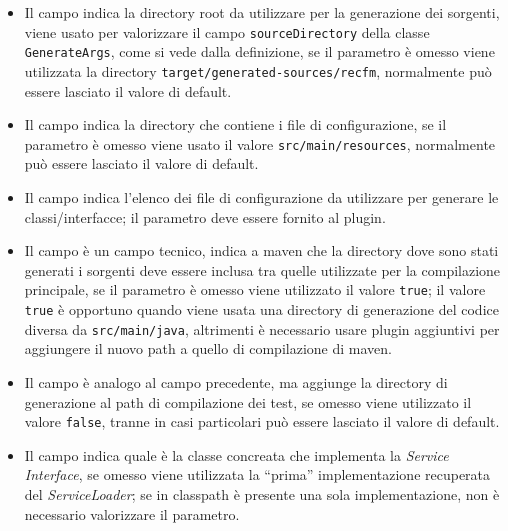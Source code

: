 \documentclass[a4paper,10pt]{report}
\begin{document}
\begin{itemize}
\item {}
	Il campo  indica la 
	directory root da utilizzare per la generazione dei sorgenti, viene usato 
	per valorizzare il campo \verb!sourceDirectory! della classe 
	\verb!GenerateArgs!, come si vede dalla definizione, se il parametro è 
	omesso viene utilizzata la directory \verb!target/generated-sources/recfm!, 
	normalmente può essere lasciato il valore di default.
\item {}
	Il campo  indica la 
	directory che contiene i file	di configurazione, se il parametro è omesso 
	viene usato il valore \verb!src/main/resources!, normalmente può essere 
	lasciato il valore di default.
\item {}
	Il campo  indica l'elenco dei 
	file di configurazione da utilizzare per generare le classi/interfacce; il 
	parametro deve essere fornito al plugin.
\item {}
	Il campo  è un 
	campo tecnico, indica a maven che la directory dove sono stati generati i 
	sorgenti deve essere inclusa tra quelle utilizzate per la compilazione 
	principale, se il parametro è omesso viene utilizzato il valore 
	\verb!true!; il valore \verb!true! è opportuno quando viene usata una 
	directory di generazione del codice diversa da \verb!src/main/java!, 
	altrimenti è necessario usare plugin aggiuntivi per aggiungere il nuovo path 
	a quello di compilazione di maven.
\item {}
	Il campo  è 
	analogo al campo precedente, ma aggiunge la directory di generazione al path 
	di compilazione dei test, se omesso viene utilizzato il valore \verb!false!, 
	tranne in casi particolari può essere lasciato il valore di default.
\item {}
	Il campo  indica 
	quale è la classe concreata che implementa la \textsl{Service Interface}, se 
	omesso viene utilizzata la ``prima'' implementazione recuperata del 
	\textsl{ServiceLoader}; se in classpath è presente una sola implementazione, 
	non è necessario valorizzare il parametro. 
\end{itemize}
\end{document}
